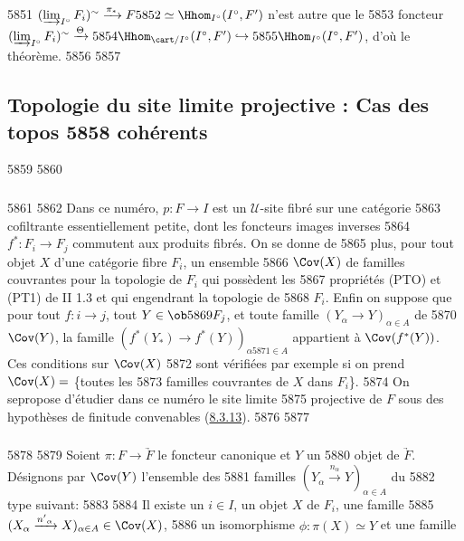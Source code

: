  5851	$(\varinjlim_{I^{\circ}} F_i)^{\sim} \xrightarrow{\pi_{\ast}} F
  5852	\simeq \Hhom_{I^{\circ}} (I^{\circ}, F')$ n'est autre que le
  5853	foncteur $(\varinjlim_{I^{\circ}} F_i)^{\sim} \xrightarrow{\Theta}
  5854	\Hhom_{\cart/I^{\circ}} (I^{\circ}, F') \hookrightarrow
  5855	\Hhom_{I^{\circ}}(I^{\circ}, F')$, d'où le théorème.
  5856	
  5857	\subsection{Topologie du site limite projective : Cas des topos
  5858	  cohérents}
  5859	
  5860	\subsubsection{}
  5861	
  5862	Dans ce numéro, $p : F \to I$ est un $𝒰$-site fibré sur une catégorie
  5863	cofiltrante essentiellement petite, dont les foncteurs images inverses
  5864	$f^{\ast} :F_i \to F_j$ commutent aux produits fibrés. On se donne de
  5865	plus, pour tout objet $X$ d'une catégorie fibre $F_i$, un ensemble
  5866	$\Cov(X)$ de familles couvrantes pour la topologie de $F_i$ qui possèdent les
  5867	propriétés (PTO) et (PT1) de II 1.3 et qui engendrant la topologie de
  5868	$F_i$. Enfin on suppose que pour tout $f : i \to j$, tout $Y \in \ob
  5869	F_j$, et toute famille $(Y_{\alpha} \to Y)_{\alpha \in A}$ de
  5870	$\Cov(Y)$, la famille $(f^{\ast}(Y_{\ast}) \to f^{\ast} (Y))_{\alpha
  5871	  \in A}$ appartient à $\Cov(f^{\ast}(Y))$. Ces conditions sur $\Cov(X)$
  5872	sont vérifiées par exemple si on prend $\Cov(X) = $ \{toutes les
  5873	  familles couvrantes de $X$ dans $F_i$\}.
  5874	On se\pageoriginale propose d'étudier dans ce numéro le site limite
  5875	projective de $F$ sous des hypothèses de finitude convenables (\hyperref[VI.thm8.3.13]{8.3.13}).
  5876	
  5877	\subsubsection{}
  5878	
  5879	Soient $\pi : F \to \underrightarrow{F}$ le foncteur canonique et $Y$ un
  5880	objet de $\underrightarrow{F}$. Désignons par $\Cov(Y)$ l'ensemble des
  5881	familles $(Y_{\alpha} \xrightarrow{n_{\alpha}} Y)_{\alpha \in A}$ du
  5882	type suivant:
  5883	
  5884	Il existe un $i \in I$, un objet $X$ de $F_i$, une famille
  5885	$(X_{\alpha} \xrightarrow{{n'}_\alpha} X)_{\alpha \in A} \in \Cov(X)$,
  5886	un isomorphisme $\phi : \pi(X) \simeq Y$ et une famille
